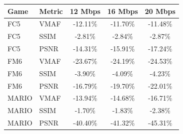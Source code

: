 \begin{tabular}{llccc}
\toprule
Game & Metric & 12 Mbps & 16 Mbps & 20 Mbps \\
\midrule
FC5 & VMAF & -12.11\% & -11.70\% & -11.48\% \\
FC5 & SSIM & -2.81\% & -2.84\% & -2.87\% \\
FC5 & PSNR & -14.31\% & -15.91\% & -17.24\% \\
\midrule
FM6 & VMAF & -23.67\% & -24.19\% & -24.53\% \\
FM6 & SSIM & -3.90\% & -4.09\% & -4.23\% \\
FM6 & PSNR & -16.79\% & -19.70\% & -22.01\% \\
\midrule
MARIO & VMAF & -13.94\% & -14.68\% & -16.71\% \\
MARIO & SSIM & -1.70\% & -1.83\% & -2.38\% \\
MARIO & PSNR & -40.40\% & -41.32\% & -45.31\% \\
\bottomrule
\end{tabular}

